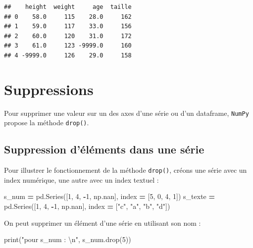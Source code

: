 \documentclass[
  12pt,
]{book}
\newenvironment{Shaded}{\begin{snugshade}}{\end{snugshade}}
\newcommand{\BuiltInTok}[1]{#1}
\newcommand{\CharTok}[1]{\textcolor[rgb]{0.31,0.60,0.02}{#1}}
\newcommand{\DecValTok}[1]{\textcolor[rgb]{0.00,0.00,0.81}{#1}}
\newcommand{\NormalTok}[1]{#1}
\newcommand{\OperatorTok}[1]{\textcolor[rgb]{0.81,0.36,0.00}{\textbf{#1}}}
\newcommand{\StringTok}[1]{\textcolor[rgb]{0.31,0.60,0.02}{#1}}
\numberwithin{equation}{section}
\numberwithin{countremarque}{section}
\begin{document}
\begin{lstlisting}
##    height  weight     age  taille
## 0    58.0     115    28.0     162
## 1    59.0     117    33.0     156
## 2    60.0     120    31.0     172
## 3    61.0     123 -9999.0     160
## 4 -9999.0     126    29.0     158
\end{lstlisting}

\section{Suppressions}\label{suppressions}

Pour supprimer une valeur sur un des axes d'une série ou d'un dataframe, \texttt{NumPy} propose la méthode \texttt{drop()}.

\subsection{Suppression d'éléments dans une série}\label{suppression-duxe9luxe9ments-dans-une-suxe9rie}

Pour illustrer le fonctionnement de la méthode \texttt{drop()}, créons une série avec un index numérique, une autre avec un index textuel :

\begin{Shaded}
\begin{Highlighting}[]
\NormalTok{s\_num }\OperatorTok{=}\NormalTok{ pd.Series([}\DecValTok{1}\NormalTok{, }\DecValTok{4}\NormalTok{, }\OperatorTok{{-}}\DecValTok{1}\NormalTok{, np.nan],}
\NormalTok{             index }\OperatorTok{=}\NormalTok{ [}\DecValTok{5}\NormalTok{, }\DecValTok{0}\NormalTok{, }\DecValTok{4}\NormalTok{, }\DecValTok{1}\NormalTok{])}
\NormalTok{s\_texte }\OperatorTok{=}\NormalTok{ pd.Series([}\DecValTok{1}\NormalTok{, }\DecValTok{4}\NormalTok{, }\OperatorTok{{-}}\DecValTok{1}\NormalTok{, np.nan],}
\NormalTok{             index }\OperatorTok{=}\NormalTok{ [}\StringTok{"c"}\NormalTok{, }\StringTok{"a"}\NormalTok{, }\StringTok{"b"}\NormalTok{, }\StringTok{"d"}\NormalTok{])}
\end{Highlighting}
\end{Shaded}

On peut supprimer un élément d'une série en utilisant son nom :

\begin{Shaded}
\begin{Highlighting}[]
\BuiltInTok{print}\NormalTok{(}\StringTok{"pour s\_num : }\CharTok{\textbackslash{}n}\StringTok{"}\NormalTok{, s\_num.drop(}\DecValTok{5}\NormalTok{))}
\end{Highlighting}
\end{Shaded}
\end{document}

